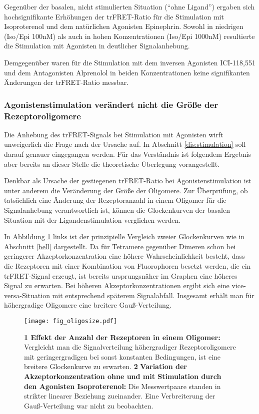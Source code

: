Gegenüber der basalen, nicht stimulierten Situation ("`ohne Ligand"') ergaben sich hochsignifikante Erhöhungen der trFRET-Ratio für die Stimulation mit Isoproterenol und dem natürlichen Agonisten Epinephrin. Sowohl in niedrigen (Iso/Epi 100\si{\nano M}) als auch in hohen Konzentrationen (Iso/Epi 1000\si{\nano M}) resultierte die Stimulation mit Agonisten in deutlicher Signalanhebung. 

Demgegenüber waren für die Stimulation mit dem inversen Agonisten ICI-118,551 und dem Antagonisten Alprenolol in beiden Konzentrationen keine signifikanten Änderungen der trFRET-Ratio messbar. 

\subsubsection{Agonistenstimulation verändert nicht die Größe der Rezeptoroligomere}
Die Anhebung des trFRET-Signals bei Stimulation mit Agonisten wirft unweigerlich die Frage nach der Ursache auf. In Abschnitt \ref{dis:stimulation} soll darauf genauer eingegangen werden. Für das Verständnis ist folgendem Ergebnis aber bereits an dieser Stelle die theoretische Überlegung vorangestellt.

 Denkbar als Ursache der gestiegenen trFRET-Ratio bei Agonistenstimulation ist unter anderem die Veränderung der Größe der Oligomere. Zur Überprüfung, ob tatsächlich eine Änderung der Rezeptoranzahl in einem Oligomer für die Signalanhebung verantwortlich ist, können die Glockenkurven der basalen Situation mit der Ligandenstimulation verglichen werden. 

In Abbildung \ref{fig:oligosize_scheme} links ist der prinzipielle Vergleich zweier Glockenkurven wie in Abschnitt \ref{bell} dargestellt. Da für Tetramere gegenüber Dimeren schon bei geringerer Akzeptorkonzentration eine höhere Wahrscheinlichkeit besteht, dass die Rezeptoren mit einer Kombination von Fluorophoren besetzt werden, die ein trFRET-Signal erzeugt, ist bereits ursprungsnäher im Graphen eine höheres Signal zu erwarten. Bei höheren Akzeptorkonzentrationen ergibt sich eine vice-versa-Situation mit entsprechend späterem Signalabfall. Insgesamt erhält man für höhergradige Oligomere eine breitere Gauß-Verteilung.

\begin{figure}[htbp]
	\centering
    \texttt{[image: fig\_oligosize.pdf]}
    \caption{\textbf{1 Effekt der Anzahl der Rezeptoren in einem Oligomer:}  Vergleicht man die Signalverteilung höhergradiger Rezeptoroligomere mit geringergradigen bei sonst konstanten Bedingungen, ist eine breitere Glockenkurve zu erwarten. \textbf{2} \textbf{Variation der Akzeptorkonzentration ohne und mit Stimulation durch den Agonisten Isoproterenol:} Die Messwertpaare standen in strikter linearer Beziehung zueinander. Eine Verbreiterung der Gauß-Verteilung war nicht zu beobachten.} 
    \label{fig:oligosize_scheme}
\end{figure}


